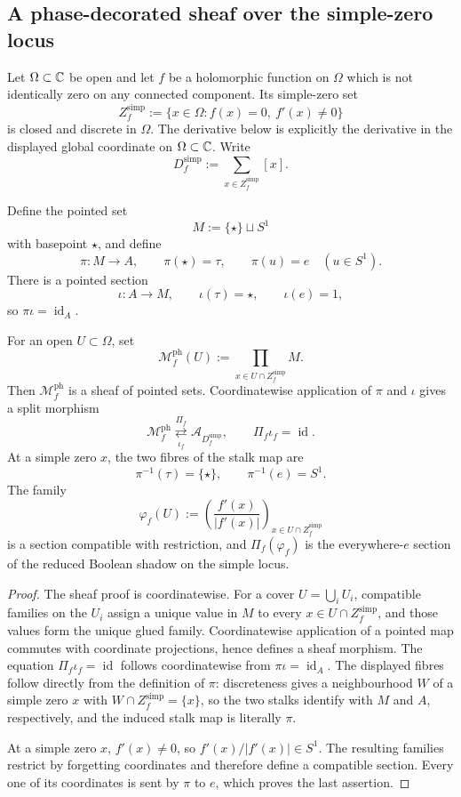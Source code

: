 \subsection{A phase-decorated sheaf over the simple-zero locus}

Let \(\Omega\subset\mathbb C\) be open and let \(f\) be a holomorphic function on
\(\Omega\) which is not identically zero on any connected component.  Its
simple-zero set
\[
Z_f^{\mathrm{simp}}
:=
\{x\in\Omega:f(x)=0,\ f'(x)\ne0\}
\]
is closed and discrete in \(\Omega\).  The derivative below is explicitly
the derivative in the displayed global coordinate on \(\Omega\subset\mathbb C\).
Write
\[
 D_f^{\mathrm{simp}}:=\sum_{x\in Z_f^{\mathrm{simp}}}[x].
\]

Define the pointed set
\[
 M:=\{\star\}\sqcup S^1
\]
with basepoint \(\star\), and define
\[
 \pi:M\longrightarrow A,
 \qquad
 \pi(\star)=\tau,\qquad \pi(u)=e\quad(u\in S^1).
\]
There is a pointed section
\[
 \iota:A\longrightarrow M,
 \qquad
 \iota(\tau)=\star,\qquad \iota(e)=1,
\]
so \(\pi\iota=\operatorname{id}_A\).

\begin{theorem}
\label{thm:phase-simple-sheaf}
For an open \(U\subset\Omega\), set
\[
 \mathcal M_f^{\mathrm{ph}}(U):=
 \prod_{x\in U\cap Z_f^{\mathrm{simp}}}M.
\]
Then \(\mathcal M_f^{\mathrm{ph}}\) is a sheaf of pointed sets.  Coordinatewise
application of
\(\pi\) and \(\iota\) gives a split morphism
\[
 \mathcal M_f^{\mathrm{ph}}
 \underset{\iota_f}{\overset{\Pi_f}{\rightleftarrows}}
 \mathcal A_{D_f^{\mathrm{simp}}},
 \qquad
 \Pi_f\iota_f=\operatorname{id}.
\]
At a simple zero \(x\), the two fibres of the stalk map are
\[
 \pi^{-1}(\tau)=\{\star\},
 \qquad
 \pi^{-1}(e)=S^1.
\]
The family
\[
 \varphi_f(U)
 :=
 \left(\frac{f'(x)}{|f'(x)|}\right)_
 {x\in U\cap Z_f^{\mathrm{simp}}}
\]
is a section compatible with restriction, and
\(\Pi_f(\varphi_f)\) is the everywhere-\(e\) section of the reduced Boolean
shadow on the simple locus.
\end{theorem}

\begin{proof}
The sheaf proof is coordinatewise.  For a cover \(U=\bigcup_iU_i\), compatible
families on the \(U_i\) assign a unique value in \(M\) to every
\(x\in U\cap Z_f^{\mathrm{simp}}\), and those values form the unique glued
family.  Coordinatewise application of a pointed map commutes with coordinate
projections, hence defines a sheaf morphism.  The equation
\(\Pi_f\iota_f=\operatorname{id}\) follows coordinatewise from
\(\pi\iota=\operatorname{id}_A\).  The displayed fibres follow directly from
the definition of \(\pi\): discreteness gives a neighbourhood \(W\) of a simple
zero \(x\) with \(W\cap Z_f^{\mathrm{simp}}=\{x\}\), so the two stalks identify
with \(M\) and \(A\), respectively, and the induced stalk map is literally
\(\pi\).

At a simple zero \(x\), \(f'(x)\ne0\), so
\(f'(x)/|f'(x)|\in S^1\).  The resulting families restrict by forgetting
coordinates and therefore define a compatible section.  Every one of its
coordinates is sent by \(\pi\) to \(e\), which proves the last assertion.
\end{proof}

